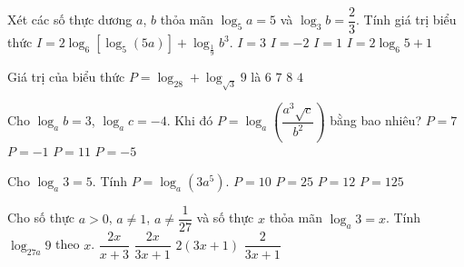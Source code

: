 \begin{ex}%
	Xét các số thực dương $a$, $b$ thỏa mãn $\log_5a=5$ và $\log_3b=\dfrac{2}{3}$. Tính giá trị  biểu thức $I=2\log_{6}\left[\log_5(5a)\right]+\log_{\tfrac{1}{9}}b^3$.
	\choice 
		{$I=3$} 
		{$I=-2$} 
		 {\True $I=1$}
		 {$I=2\log_{6}5+1$}
\end{ex}

\begin{ex}%
	Giá trị  của biểu thức $P=\log_28+\log_{\sqrt{3}}9$ là
	\choice 
		{$6$} 
		{\True $7$} 
		{$8$} 
		 {$4$}
\end{ex}

\begin{ex}%
	Cho  $\log_ab=3$, $\log_ac=-4$. Khi đó $P=\log_a\left(\dfrac{a^3\sqrt{c}}{b^2}\right)$ bằng bao nhiêu?
	\choice 
		{$P=7$} 
		 {$P=-1$}
		{$P=11$} 
		 {$P=-5$}
\end{ex}

\begin{ex}%
	Cho $\log_a3=5$.  Tính $P=\log_a\left(3a^5\right)$.
	 \choice
		{\True  $P=10$}
		 {$P=25$}
		{$P=12$} 
		{$P=125$} 
\end{ex}

\begin{ex}%
	Cho số thực $a>0$, $a\ne 1$, $a\ne  \dfrac{1}{27}$ và số thực $x$ thỏa mãn $\log_a3=x$. Tính $\log_{27a}9$ theo $x$.
	\choice 
		 {$\dfrac{2x}{x+3}$}
		 {\True $\dfrac{2x}{3x+1}$}
		 {$2(3x+1)$}
		{$\dfrac{2}{3x+1}$} 
\end{ex}

